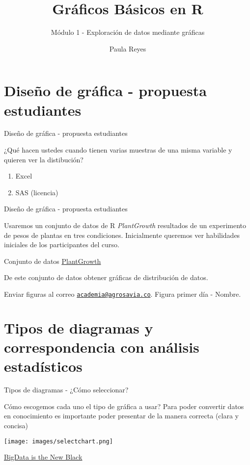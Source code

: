 \documentclass[ignorenonframetext,]{beamer}
\institute{Agrosavia}
\title{Gráficos Básicos en R}
\subtitle{Módulo 1 - Exploración de datos mediante gráficas}
\author{Paula Reyes}
\institute{AGROSAVIA}
\date{}
\providecommand{\tightlist}{%
  \setlength{\itemsep}{0pt}\setlength{\parskip}{0pt}}
\begin{document}
\frame{\titlepage}

\begin{frame}
\tableofcontents[hideallsubsections]
\end{frame}

\section{Diseño de gráfica - propuesta
estudiantes}\label{diseno-de-grafica---propuesta-estudiantes}

\begin{frame}{Diseño de gráfica - propuesta estudiantes}

¿Qué hacen ustedes cuando tienen varias muestras de una misma variable y
quieren ver la distibución?

\begin{enumerate}
\def\labelenumi{(\alph{enumi})}
\tightlist
\item
  Excel
\item
  SAS (licencia)
\end{enumerate}

\end{frame}

\begin{frame}{Diseño de gráfica - propuesta estudiantes}

Usaremos un conjunto de datos de R \textit{PlantGrowth} resultados de un
experimento de pesos de plantas en tres condiciones. Inicialmente
queremos ver habilidades iniciales de los participantes del curso.

Conjunto de datos
\underline{\textcolor{blue}{\href{https://corpoicaorg.sharepoint.com/:x:/s/academiaagrosaviacurso.r/EfMk4erbqc9NmgwUukiYUIUBCy2gw9arMpAQbzHH3Cqq9Q?e=mJwDfK} {PlantGrowth}}}

De este conjunto de datos obtener gráficas de distribución de datos.

Enviar figuras al correo
\href{mailto:academia@agrosavia.co}{\nolinkurl{academia@agrosavia.co}}.
Figura primer día - Nombre.

\end{frame}

\section{Tipos de diagramas y correspondencia con análisis
estadísticos}\label{tipos-de-diagramas-y-correspondencia-con-analisis-estadisticos}

\begin{frame}{Tipos de diagramas - ¿Cómo seleccionar?}

Cómo escogemos cada uno el tipo de gráfica a usar? Para poder convertir
datos en conocimiento es importante poder presentar de la manera
correcta (clara y concisa)

\texttt{[image: images/selectchart.png]}

\underline{\tiny{\textcolor{blue}{\href{http://bigdata.black/analytics-predictions/visual-analytics/how-to-choose-the-right-chart/}{BigData is the New Black}}}}

\end{frame}
\end{document}
